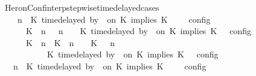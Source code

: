 \begin{isabellebody}
\isamarkupfalse%
%
\endisatagproof
{\isafoldproof}%
%
\isadelimproof
\isanewline
%
\endisadelimproof
\isanewline
{}\isamarkupfalse%
\ HeronConf{\isacharunderscore}interp{\isacharunderscore}stepwise{\isacharunderscore}timedelayed{\isacharunderscore}cases{\isacharcolon}\isanewline
\ \ {\isacartoucheopen}{\isasymlbrakk}\ {\isasymGamma}{\isacharcomma}\ n\ {\isasymturnstile}\ {\isacharparenleft}{\isacharparenleft}K\ time{\isacharminus}delayed\ by\ {\isasymdelta}{\isasymtau}\ on\ K\ implies\ K\ {\isacharhash}\ {\isasymPsi}{\isacharparenright}\ {\isasymtriangleright}\ {\isasymPhi}\ {\isasymrbrakk}\isactrlsub c\isactrlsub o\isactrlsub n\isactrlsub f\isactrlsub i\isactrlsub g\isanewline
\ \ \ \ {\isacharequal}\ {\isasymlbrakk}\ {\isacharparenleft}{\isacharparenleft}K\ {\isasymnot}{\isasymUp}\ n{\isacharparenright}\ {\isacharhash}\ {\isasymGamma}{\isacharparenright}{\isacharcomma}\ n\ {\isasymturnstile}\ {\isasymPsi}\ {\isasymtriangleright}\ {\isacharparenleft}{\isacharparenleft}K\ time{\isacharminus}delayed\ by\ {\isasymdelta}{\isasymtau}\ on\ K\ implies\ K\ {\isacharhash}\ {\isasymPhi}{\isacharparenright}\ {\isasymrbrakk}\isactrlsub c\isactrlsub o\isactrlsub n\isactrlsub f\isactrlsub i\isactrlsub g\isanewline
\ \ \ \ {\isasymunion}\ {\isasymlbrakk}\ {\isacharparenleft}{\isacharparenleft}K\ {\isasymUp}\ n{\isacharparenright}\ {\isacharhash}\ {\isacharparenleft}K\ {\isacharat}\ n\ {\isasymoplus}\ {\isasymdelta}{\isasymtau}\ {\isasymRightarrow}\ K\ {\isacharhash}\ {\isasymGamma}{\isacharparenright}{\isacharcomma}\ n\isanewline
\ \ \ \ \ \ \ \ {\isasymturnstile}\ {\isasymPsi}\ {\isasymtriangleright}\ {\isacharparenleft}{\isacharparenleft}K\ time{\isacharminus}delayed\ by\ {\isasymdelta}{\isasymtau}\ on\ K\ implies\ K\ {\isacharhash}\ {\isasymPhi}{\isacharparenright}\ {\isasymrbrakk}\isactrlsub c\isactrlsub o\isactrlsub n\isactrlsub f\isactrlsub i\isactrlsub g{\isacartoucheclose}\isanewline
%
\isadelimproof
%
\endisadelimproof
%
\isatagproof
{}\isamarkupfalse%
\ {\isacharminus}\isanewline
\ \ \isamarkupfalse%
\ {}{\isacharcolon}{\isacartoucheopen}{\isasymlbrakk}\ {\isasymGamma}{\isacharcomma}\ n\ {\isasymturnstile}\ {\isacharparenleft}K\ time{\isacharminus}delayed\ by\ {\isasymdelta}{\isasymtau}\ on\ K\ implies\ K\ {\isacharhash}\ {\isasymPsi}\ {\isasymtriangleright}\ {\isasymPhi}\ {\isasymrbrakk}\isactrlsub c\isactrlsub o\isactrlsub n\isactrlsub f\isactrlsub i\isactrlsub g\isanewline

\end{isabellebody}
